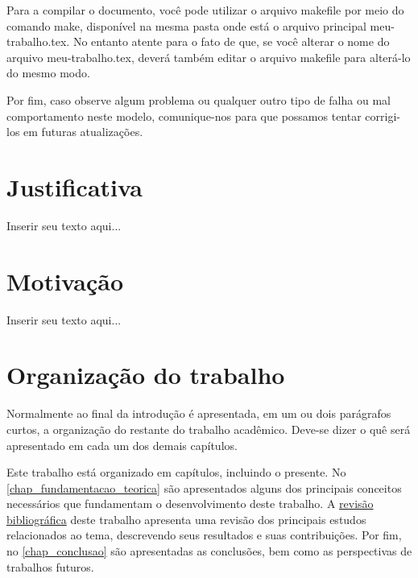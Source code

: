 Para a compilar o documento, você pode utilizar o arquivo {\color{red} makefile} por meio do comando {\color{red} make}, disponível na mesma pasta onde está o arquivo principal {\color{red} meu-\allowbreak trabalho.tex}.
No entanto atente para o fato de que, se você alterar o nome do arquivo {\color{red} meu-\allowbreak trabalho.tex}, deverá também editar o arquivo {\color{red} makefile} para alterá-lo do mesmo modo.

Por fim, caso observe algum problema ou qualquer outro tipo de falha ou mal comportamento neste modelo, comunique-nos para que possamos tentar corrigi-los em futuras atualizações.

\section{Justificativa}
\label{sec_justificativa}

Inserir seu texto aqui...

\section{Motivação}
\label{sec_motivacao}

Inserir seu texto aqui...

\section{Organização do trabalho}
\label{sec_organizacao_trabalho}

Normalmente ao final da introdução é apresentada, em um ou dois parágrafos curtos, a organização do restante do trabalho acadêmico.
Deve-se dizer o quê será apresentado em cada um dos demais capítulos.

Este trabalho está organizado em capítulos, incluindo o presente.
No \autoref{chap_fundamentacao_teorica} são apresentados alguns dos principais conceitos necessários que fundamentam o desenvolvimento deste trabalho.
A \hyperref[chap_trabalhos_relacionados]{revisão bibliográfica} deste trabalho apresenta uma revisão dos principais estudos relacionados ao tema, descrevendo seus resultados e suas contribuições.
Por fim, no \autoref{chap_conclusao} são apresentadas as conclusões, bem como as perspectivas de trabalhos futuros.
